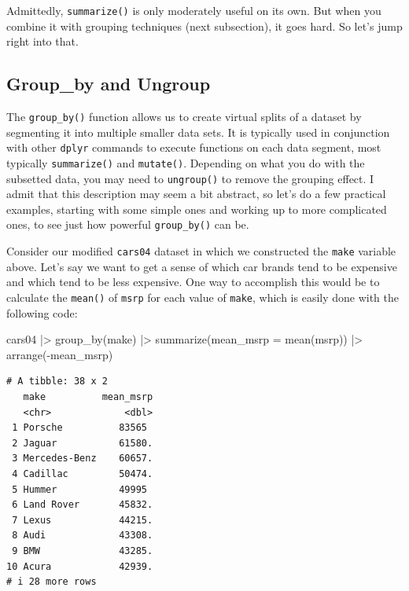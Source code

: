 \documentclass[
  letterpaper,
]{book}
\newenvironment{Shaded}{\begin{snugshade}}{\end{snugshade}}
\newcommand{\AttributeTok}[1]{\textcolor[rgb]{0.40,0.45,0.13}{#1}}
\newcommand{\FunctionTok}[1]{\textcolor[rgb]{0.28,0.35,0.67}{#1}}
\newcommand{\NormalTok}[1]{\textcolor[rgb]{0.00,0.23,0.31}{#1}}
\newcommand{\SpecialCharTok}[1]{\textcolor[rgb]{0.37,0.37,0.37}{#1}}
\begin{document}
Admittedly, \texttt{summarize()} is only moderately useful on its own.
But when you combine it with grouping techniques (next subsection), it
goes hard. So let's jump right into that.

\subsection{Group\_by and Ungroup}\label{group_by-and-ungroup}

The \texttt{group\_by()} function allows us to create virtual splits of
a dataset by segmenting it into multiple smaller data sets. It is
typically used in conjunction with other \texttt{dplyr} commands to
execute functions on each data segment, most typically
\texttt{summarize()} and \texttt{mutate()}. Depending on what you do
with the subsetted data, you may need to \texttt{ungroup()} to remove
the grouping effect. I admit that this description may seem a bit
abstract, so let's do a few practical examples, starting with some
simple ones and working up to more complicated ones, to see just how
powerful \texttt{group\_by()} can be.

Consider our modified \texttt{cars04} dataset in which we constructed
the \texttt{make} variable above. Let's say we want to get a sense of
which car brands tend to be expensive and which tend to be less
expensive. One way to accomplish this would be to calculate the
\texttt{mean()} of \texttt{msrp} for each value of \texttt{make}, which
is easily done with the following code:

\begin{Shaded}
\begin{Highlighting}[]
\NormalTok{cars04 }\SpecialCharTok{|\textgreater{}} 
  \FunctionTok{group\_by}\NormalTok{(make) }\SpecialCharTok{|\textgreater{}} 
  \FunctionTok{summarize}\NormalTok{(}\AttributeTok{mean\_msrp =} \FunctionTok{mean}\NormalTok{(msrp)) }\SpecialCharTok{|\textgreater{}} 
  \FunctionTok{arrange}\NormalTok{(}\SpecialCharTok{{-}}\NormalTok{mean\_msrp) }
\end{Highlighting}
\end{Shaded}

\begin{verbatim}
# A tibble: 38 x 2
   make          mean_msrp
   <chr>             <dbl>
 1 Porsche          83565 
 2 Jaguar           61580.
 3 Mercedes-Benz    60657.
 4 Cadillac         50474.
 5 Hummer           49995 
 6 Land Rover       45832.
 7 Lexus            44215.
 8 Audi             43308.
 9 BMW              43285.
10 Acura            42939.
# i 28 more rows
\end{verbatim}
\end{document}

